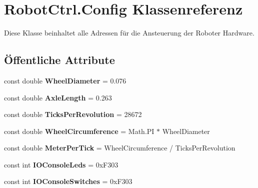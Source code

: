 \hypertarget{class_robot_ctrl_1_1_config}{
\section{RobotCtrl.Config Klassenreferenz}
\label{class_robot_ctrl_1_1_config}
}


Diese Klasse beinhaltet alle Adressen f\"{u}r die Ansteuerung der Roboter Hardware.  


\subsection*{Öffentliche Attribute}
\begin{DoxyCompactItemize}
\item 
\hypertarget{class_robot_ctrl_1_1_config_aa0a24400febddc495f58ccba68c6b5ef}{
const double {\bfseries WheelDiameter} = 0.076}
\label{class_robot_ctrl_1_1_config_aa0a24400febddc495f58ccba68c6b5ef}

\item 
\hypertarget{class_robot_ctrl_1_1_config_ad6c428a3696bf90c39cb30dd26c2cb58}{
const double {\bfseries AxleLength} = 0.263}
\label{class_robot_ctrl_1_1_config_ad6c428a3696bf90c39cb30dd26c2cb58}

\item 
\hypertarget{class_robot_ctrl_1_1_config_ab09729a18f3d44209d9963c414c86d5f}{
const double {\bfseries TicksPerRevolution} = 28672}
\label{class_robot_ctrl_1_1_config_ab09729a18f3d44209d9963c414c86d5f}

\item 
\hypertarget{class_robot_ctrl_1_1_config_ae8326de1ceb38f2ed7bafbb9d3dd4e1d}{
const double {\bfseries WheelCircumference} = Math.PI $\ast$ WheelDiameter}
\label{class_robot_ctrl_1_1_config_ae8326de1ceb38f2ed7bafbb9d3dd4e1d}

\item 
\hypertarget{class_robot_ctrl_1_1_config_af4084917ff005fc520bb1c337503c33d}{
const double {\bfseries MeterPerTick} = WheelCircumference / TicksPerRevolution}
\label{class_robot_ctrl_1_1_config_af4084917ff005fc520bb1c337503c33d}

\item 
\hypertarget{class_robot_ctrl_1_1_config_a989257f3f8a56aae7eaa00bf9de1d97f}{
const int {\bfseries IOConsoleLeds} = 0xF303}
\label{class_robot_ctrl_1_1_config_a989257f3f8a56aae7eaa00bf9de1d97f}

\item 
\hypertarget{class_robot_ctrl_1_1_config_a3d2acda1cb840afaf782a2c71eedc6b4}{
const int {\bfseries IOConsoleSwitches} = 0xF303}
\label{class_robot_ctrl_1_1_config_a3d2acda1cb840afaf782a2c71eedc6b4}


\end{DoxyCompactItemize}
